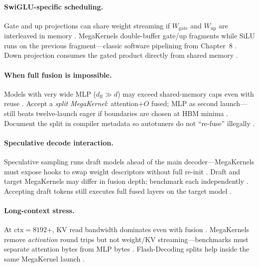 \paragraph{SwiGLU-specific scheduling.} Gate and up projections can share weight streaming if $W_{\mathrm{gate}}$ and $W_{\mathrm{up}}$ are interleaved in memory \citep{patel2025llminference,liu2024deepseekv3}. MegaKernels double-buffer gate/up fragments while SiLU runs on the previous fragment---classic software pipelining from Chapter~8 \citep{semianalysis2024tma,amd2024aie}. Down projection consumes the gated product directly from shared memory \citep{yirage2026,taxbreak2026}.

\paragraph{When full fusion is impossible.} Models with very wide MLP ($d_{\mathrm{ff}} \gg d$) may exceed shared-memory caps even with reuse \citep{liu2024deepseekv3,nvidia2022hopper}. Accept a \emph{split MegaKernel}: attention+$O$ fused; MLP as second launch---still beats twelve-launch eager if boundaries are chosen at HBM minima \citep{taxbreak2026,memoryfloor2026}. Document the split in compiler metadata so autotuners do not ``re-fuse'' illegally \citep{yirage2026,chen2020compilerbasedhardw}.

\paragraph{Speculative decode interaction.} Speculative sampling runs draft models ahead of the main decoder---MegaKernels must expose hooks to swap weight descriptors without full re-init \citep{patel2025llminference,liu2024deepseekv3}. Draft and target MegaKernels may differ in fusion depth; benchmark each independently \citep{taxbreak2026,memoryfloor2026}. Accepting draft tokens still executes full fused layers on the target model \citep{kwon2023vllm,dao2023flashdecoding}.

\paragraph{Long-context stress.} At ctx${=}8192$+, KV read bandwidth dominates even with fusion \citep{dao2023flashdecoding,patel2025llminference}. MegaKernels remove \emph{activation} round trips but not weight/KV streaming---benchmarks must separate attention bytes from MLP bytes \citep{dao2022flashattention,memoryfloor2026}. Flash-Decoding splits help inside the same MegaKernel launch \citep{dao2023flashdecoding,semianalysis2024tma}.

